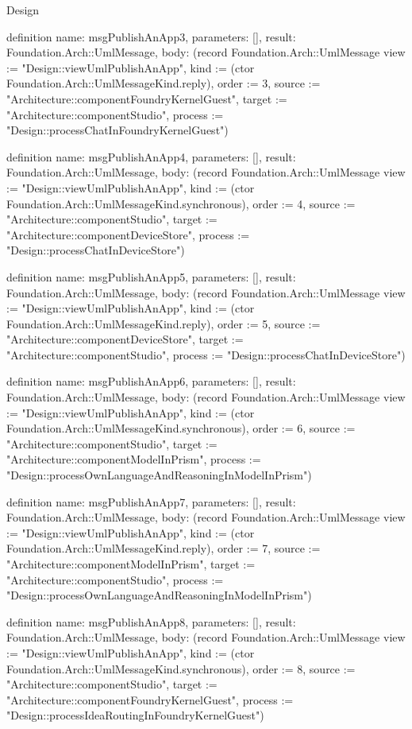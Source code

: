\begin{lexlean}{Design}
\begin{semanticmodule}
definition{
  name: msgPublishAnApp3,
  parameters: [],
  result: Foundation.Arch::UmlMessage,
  body: (record Foundation.Arch::UmlMessage {view := "Design::viewUmlPublishAnApp", kind := (ctor Foundation.Arch::UmlMessageKind.reply), order := 3, source := "Architecture::componentFoundryKernelGuest", target := "Architecture::componentStudio", process := "Design::processChatInFoundryKernelGuest"})
}

definition{
  name: msgPublishAnApp4,
  parameters: [],
  result: Foundation.Arch::UmlMessage,
  body: (record Foundation.Arch::UmlMessage {view := "Design::viewUmlPublishAnApp", kind := (ctor Foundation.Arch::UmlMessageKind.synchronous), order := 4, source := "Architecture::componentStudio", target := "Architecture::componentDeviceStore", process := "Design::processChatInDeviceStore"})
}

definition{
  name: msgPublishAnApp5,
  parameters: [],
  result: Foundation.Arch::UmlMessage,
  body: (record Foundation.Arch::UmlMessage {view := "Design::viewUmlPublishAnApp", kind := (ctor Foundation.Arch::UmlMessageKind.reply), order := 5, source := "Architecture::componentDeviceStore", target := "Architecture::componentStudio", process := "Design::processChatInDeviceStore"})
}

definition{
  name: msgPublishAnApp6,
  parameters: [],
  result: Foundation.Arch::UmlMessage,
  body: (record Foundation.Arch::UmlMessage {view := "Design::viewUmlPublishAnApp", kind := (ctor Foundation.Arch::UmlMessageKind.synchronous), order := 6, source := "Architecture::componentStudio", target := "Architecture::componentModelInPrism", process := "Design::processOwnLanguageAndReasoningInModelInPrism"})
}

definition{
  name: msgPublishAnApp7,
  parameters: [],
  result: Foundation.Arch::UmlMessage,
  body: (record Foundation.Arch::UmlMessage {view := "Design::viewUmlPublishAnApp", kind := (ctor Foundation.Arch::UmlMessageKind.reply), order := 7, source := "Architecture::componentModelInPrism", target := "Architecture::componentStudio", process := "Design::processOwnLanguageAndReasoningInModelInPrism"})
}

definition{
  name: msgPublishAnApp8,
  parameters: [],
  result: Foundation.Arch::UmlMessage,
  body: (record Foundation.Arch::UmlMessage {view := "Design::viewUmlPublishAnApp", kind := (ctor Foundation.Arch::UmlMessageKind.synchronous), order := 8, source := "Architecture::componentStudio", target := "Architecture::componentFoundryKernelGuest", process := "Design::processIdeaRoutingInFoundryKernelGuest"})
}


\end{semanticmodule}
\end{lexlean}
